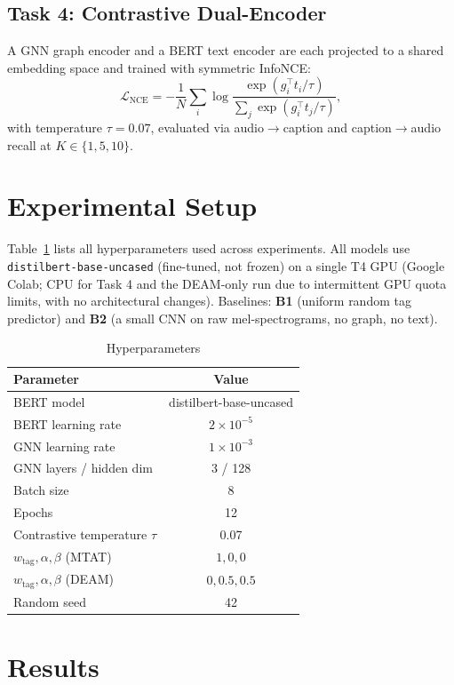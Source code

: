 \documentclass[conference]{IEEEtran}
\begin{document}
\subsection{Task 4: Contrastive Dual-Encoder}
A GNN graph encoder and a BERT text encoder are each projected to a
shared embedding space and trained with symmetric InfoNCE:
\begin{equation}
\mathcal{L}_{\text{NCE}} = -\frac{1}{N}\sum_i \log\frac{\exp(g_i^\top t_i/\tau)}{\sum_j \exp(g_i^\top t_j/\tau)},
\end{equation}
with temperature $\tau = 0.07$, evaluated via audio$\to$caption and
caption$\to$audio recall at $K \in \{1,5,10\}$.

\section{Experimental Setup}
Table~\ref{tab:hyperparams} lists all hyperparameters used across
experiments. All models use \texttt{distilbert-base-uncased} (fine-tuned,
not frozen) on a single T4 GPU (Google Colab; CPU for Task 4 and the
DEAM-only run due to intermittent GPU quota limits, with no
architectural changes). Baselines: \textbf{B1} (uniform random tag
predictor) and \textbf{B2} (a small CNN on raw mel-spectrograms, no
graph, no text).

\begin{table}[h]
\centering
\caption{Hyperparameters}
\label{tab:hyperparams}
\begin{tabular}{lc}
\toprule
Parameter & Value \\
\midrule
BERT model & distilbert-base-uncased \\
BERT learning rate & $2\times10^{-5}$ \\
GNN learning rate & $1\times10^{-3}$ \\
GNN layers / hidden dim & 3 / 128 \\
Batch size & 8 \\
Epochs & 12 \\
Contrastive temperature $\tau$ & 0.07 \\
$w_{\text{tag}}, \alpha, \beta$ (MTAT) & $1, 0, 0$ \\
$w_{\text{tag}}, \alpha, \beta$ (DEAM) & $0, 0.5, 0.5$ \\
Random seed & 42 \\
\bottomrule
\end{tabular}
\end{table}

\section{Results}
\end{document}
